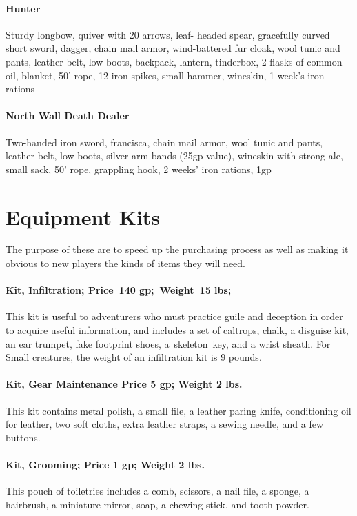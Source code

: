 \begin{multicols}{2}
\paragraph{Hunter} Sturdy longbow, quiver with 20 arrows, leaf- headed spear, gracefully curved short sword, dagger, chain mail armor, wind-battered fur cloak, wool tunic and pants, leather belt, low boots, backpack, lantern, tinderbox, 2 flasks of common oil, blanket, 50' rope, 12 iron spikes, small hammer, wineskin, 1 week’s iron rations

\paragraph{North Wall Death Dealer} Two-handed iron sword, francisca, chain mail armor, wool tunic and pants, leather belt,
low boots, silver arm-bands (25gp value), wineskin with strong ale, small sack, 50' rope, grappling hook, 2 weeks’ iron rations, 1gp

\section{Equipment Kits} 

\begin{framed}\centering
The purpose of these are to speed up the purchasing process as well as making it obvious to new players the kinds of items they will need.  
\end{framed}

\paragraph{Kit, Infiltration; Price 140 gp; Weight 15 lbs;}

This kit is useful to adventurers who must practice guile and deception in order to acquire useful information, and includes a set of caltrops, chalk, a disguise kit, an ear trumpet, fake footprint shoes, a skeleton key, and a wrist sheath. For Small creatures, the weight of an infiltration kit is 9 pounds.

\paragraph{Kit, Gear Maintenance Price 5 gp; Weight 2 lbs.}
This kit contains metal polish, a small file, a leather paring knife, conditioning oil for leather, two soft cloths, extra leather straps, a sewing needle, and a few buttons.

\paragraph{Kit, Grooming; Price 1 gp; Weight 2 lbs.}
This pouch of toiletries includes a comb, scissors, a nail file, a sponge, a hairbrush, a miniature mirror, soap, a chewing stick, and tooth powder.


\end{multicols}

